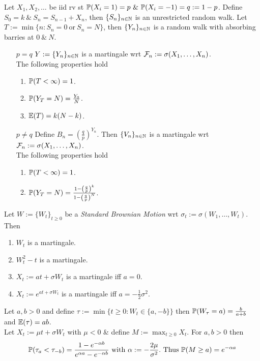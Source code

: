 \documentclass[11pt,a4paper]{article}
\begin{document}
Let $X_1,X_2,\dots$ be iid rv st $\prob(X_i=1)=p\ \&\ \prob(X_i=-1)=q:=1-p$. Define $S_0=k\ \&\ S_n=S_{n-1}+X_n$, then $\{S_n\}_{n\in\mathbb{N}}$ is an unrestricted random walk. Let $T:=\min\{n:S_n=0\ \mathrm{or}\ S_n=N\}$, then $\{Y_n\}_{n\in\mathbb{N}}$ is a random walk with absorbing barries at $0\ \&\ N$.
\begin{itemize}
	\item[$p=q$]$Y:=\{Y_n\}_{n\in\mathbb{N}}$ is a martingale wrt $\mathcal{F}_n:=\sigma(X_1,\dots,X_n)$.\\ The following properties hold
\begin{enumerate}
	\item $\mathbb{P}(T<\infty)=1$.
	\item $\mathbb{P}(Y_T=N)=\frac{Y_0}{N}$.
	\item $\mathbb{E}(T)=k(N-k)$.
\end{enumerate}
	\item[$p\neq q$]Define $B_n=\left(\frac{q}{p}\right)^{Y_n}$. Then $\{V_n\}_{n\in\mathbb{N}}$ is a martingale wrt $\mathcal{F}_n:=\sigma(X_1,\dots,X_n)$.\\ The following properties hold
	\begin{enumerate}
		\item $\mathbb{P}(T<\infty)=1$.
		\item $\mathbb{P}(Y_T=N)=\frac{1-\left(\frac{q}{p}\right)^k}{1-\left(\frac{q}{p}\right)^N}$.
	\end{enumerate}
\end{itemize} 

Let $W:=\{W_t\}_{t\geq0}$ be a \textit{Standard Brownian Motion} wrt $\sigma_t:=\sigma(W_1,\dots,W_t)$. Then
\begin{enumerate}
	\item $W_t$ is a martingale.
	\item $W_t^2-t$ is a martingale.
	\item $X_t:=at+\sigma W_t$ is a martingale iff $a=0$.
	\item $X_t:=e^{at+\sigma W_t}$ is a martingale iff $a=-\frac{1}{2}\sigma^2$.
\end{enumerate}
Let $a,b>0$ and define $\tau:=\min\{t\geq0:W_t\in\{a,-b\}\}$ then $\mathbb{P}(W_\tau=a)=\frac{b}{a+b}$ and $\mathbb{E}(\tau)=ab$.\\
Let $X_t:=\mu t+\sigma W_t$ with $\mu<0$ \& define $M:=\max_{t\geq0} X_t$. For $a,b>0$ then
$$\prob(\tau_a<\tau_{-b})=\frac{1-e^{-\alpha b}}{e^{\alpha a}-e^{-\alpha b}}\ \mathrm{with}\ \alpha:=-\frac{2\mu}{\sigma^2}.\ \mathrm{Thus}\ \prob(M\geq a)=e^{-\alpha a}$$
\end{document}
